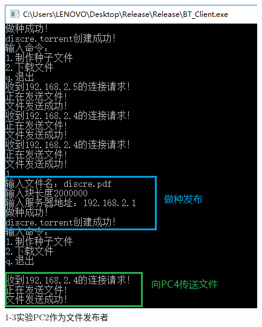 \documentclass[thesis]{thesis}
\begin{document}
	\begin{minipage}{0.5\linewidth}
	\begin{figure}[H]
		\centering
		\includegraphics[width=\linewidth]{fig/PC2_31.png}
		\caption{1-3实验\quad PC2作为文件发布者}
		\label{res:PC2_31}
	\end{figure}
	\end{minipage}
\end{document}

